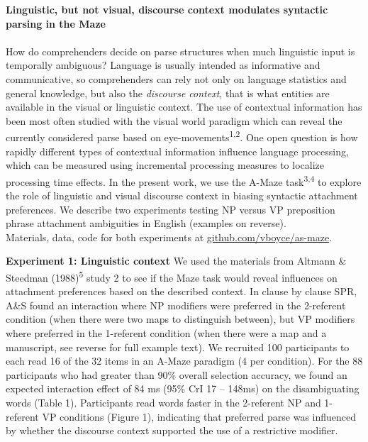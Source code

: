 \documentclass[11pt,a4paper]{article}
\renewcommand{\title}[1]{\textbf{#1}\\}
\newcommand{\authors}[1]{\iftoggle{anonymous}{\phantom{#1}}{#1}\\}
\begin{document}
	







	\noindent\title{Linguistic, but not visual, discourse context modulates syntactic parsing in the Maze}
	\authors{Veronica Boyce (Stanford University, vboyce@stanford.edu), Roger P. Levy (MIT)} 
	
	
	How do comprehenders  decide on parse structures when much linguistic input is temporally ambiguous?  Language is usually intended as informative and communicative, so comprehenders can rely not only on language statistics and general knowledge, but also the \textit{discourse context}, that is what entities are available in the visual or linguistic context. The use of contextual information has been most often studied with the visual world paradigm which can reveal the currently considered parse based on eye-movements\textsuperscript{1,2}. One open question is how rapidly different types of contextual information influence language processing, which can be measured using incremental processing measures to localize processing time effects. In the present work, we use the A-Maze task\textsuperscript{3,4} to explore the role of linguistic and visual discourse context in biasing syntactic attachment preferences. We describe two experiments testing NP versus VP preposition phrase attachment ambiguities in English (examples on reverse). 	\\Materials, data, code for both experiments at \url{github.com/vboyce/as-maze}.
	
	\noindent\textbf{Experiment 1: Linguistic context} We used the materials from Altmann \& Steedman (1988)\textsuperscript{5} study 2
	to see if the Maze task would reveal influences on attachment preferences based on the described context. In clause by clause SPR, A\&S found an interaction where NP modifiers were preferred in the 2-referent condition (when there were two maps to distinguish between), but VP modifiers where preferred in the 1-referent condition (when there were a map and a manuscript, see reverse for full example text). We recruited 100 participants to each read 16 of the 32 items in an A-Maze paradigm (4 per condition). For the 88 participants who had greater than 90\% overall selection accuracy, we found an expected interaction effect of 84 ms (95\% CrI 17 -- 148ms) on the disambiguating words (Table 1). Participants read words faster in the 2-referent NP and 1-referent VP conditions (Figure 1), indicating that preferred parse was influenced by whether the discourse context supported the use of a restrictive modifier. 
	
\end{document}
